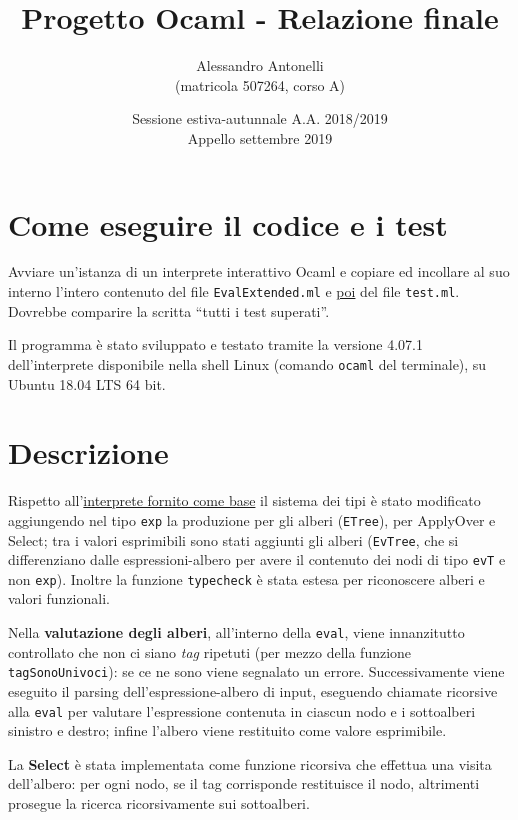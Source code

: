 \documentclass[a4paper,12pt]{article}
\title { \vspace{-4.0cm}{\small Università di Pisa\\Corso di Programmazione II (273AA)\\[0.7cm]}Progetto Ocaml - Relazione finale }
\author { Alessandro Antonelli\\(matricola 507264, corso A) }
\date { Sessione estiva-autunnale A.A. 2018/2019\\Appello settembre 2019 }
\begin{document}
 \maketitle
 
 
 \section{ Come eseguire il codice e i test }
 
 Avviare un'istanza di un interprete interattivo Ocaml e copiare ed incollare al suo interno l'intero contenuto del file \texttt{EvalExtended.ml} e \underline{poi} del file \texttt{test.ml}. Dovrebbe comparire la scritta ``tutti i test superati''.
 
 Il programma è stato sviluppato e testato tramite la versione 4.07.1 dell'interprete disponibile nella shell Linux (comando \texttt{ocaml} del terminale), su Ubuntu 18.04 LTS 64 bit.
 
 \section{ Descrizione }
  
 Rispetto all'\href{http://pages.di.unipi.it/levi/codice-18/evalFunEnvFull.ml}{interprete fornito come base} il sistema dei tipi è stato modificato aggiungendo nel tipo \texttt{exp} la produzione per gli alberi (\texttt{ETree}), per ApplyOver e Select; tra i valori esprimibili sono stati aggiunti gli alberi (\texttt{EvTree}, che si differenziano dalle espressioni-albero per avere il contenuto dei nodi di tipo \texttt{evT} e non \texttt{exp}). Inoltre la funzione \texttt{typecheck} è stata estesa per riconoscere alberi e valori funzionali.

 Nella \textbf{valutazione degli alberi}, all'interno della \texttt{eval}, viene innanzitutto controllato che non ci siano \textit{tag} ripetuti (per mezzo della funzione \texttt{tagSonoUnivoci}): se ce ne sono viene segnalato un errore. Successivamente viene eseguito il parsing dell'espressione-albero di input, eseguendo chiamate ricorsive alla \texttt{eval} per valutare l'espressione contenuta in ciascun nodo e i sottoalberi sinistro e destro; infine l'albero viene restituito come valore esprimibile.
 
 La \textbf{Select} è stata implementata come funzione ricorsiva che effettua una visita dell'albero: per ogni nodo, se il tag corrisponde restituisce il nodo, altrimenti prosegue la ricerca ricorsivamente sui sottoalberi.
 
\end{document}
